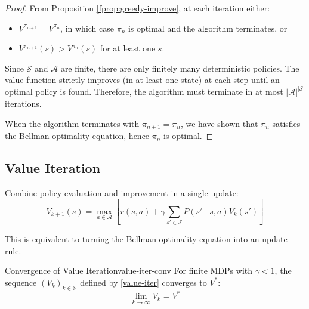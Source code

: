 \documentclass[a4paper, 11pt]{article}
\numberwithin{equation}{section}
\theoremstyle{plain}
\theoremstyle{definition}
\newcommand{\1}{{\mathbbm 1}}
\newcommand{\mc}[1]{\mathcal{#1}}
\newcommand{\N}{{\mathbb{N}}}
\begin{document}
	\begin{proof}
		From Proposition \ref{fprop:greedy-improve}, at each iteration either:
		\begin{itemize}
			\item $V^{\pi_{n+1}} = V^{\pi_n}$, in which case $\pi_n$ is optimal and the algorithm terminates, or
			\item $V^{\pi_{n+1}}(s) > V^{\pi_n}(s)$ for at least one $s$.
		\end{itemize}
		
		Since $\mc{S}$ and $\mc{A}$ are finite, there are only finitely many deterministic policies. The value function strictly improves (in at least one state) at each step until an optimal policy is found. Therefore, the algorithm must terminate in at most $|\mc{A}|^{|\mc{S}|}$ iterations.
		
		When the algorithm terminates with $\pi_{n+1} = \pi_n$, we have shown that $\pi_n$ satisfies the Bellman optimality equation, hence $\pi_n$ is optimal.
	\end{proof}
	
	\subsection{Value Iteration}
	
	Combine policy evaluation and improvement in a single update:
	\begin{equation}\label{value-iter}
		V_{k+1}(s) = \max_{a \in \mc{A}} \left[ r(s, a) + \gamma \sum_{s' \in \mc{S}} P(s'\;|\; s, a) V_k(s') \right]
	\end{equation}
	
	This is equivalent to turning the Bellman optimality equation into an update rule.
	
	\begin{ftheo}{Convergence of Value Iteration}{value-iter-conv}
		For finite MDPs with $\gamma < 1$, the sequence $(V_k)_{k \in \N}$ defined by \eqref{value-iter} converges to $V^*$:
		\begin{equation}
			\lim_{k \to \infty} V_k = V^*
		\end{equation}
	\end{ftheo}
	
\end{document}
